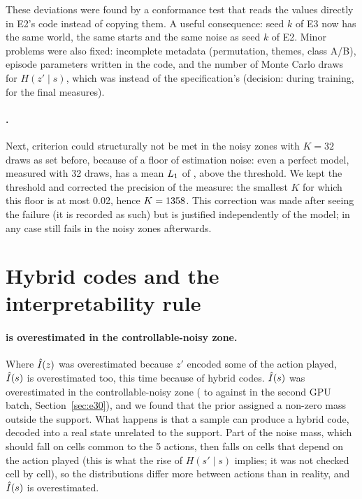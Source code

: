 \documentclass[10pt]{article}
\begin{document}
These deviations were found by a conformance test that reads the values directly in E2's code instead of copying them.
A useful consequence: seed $k$ of E3 now has the same world, the same starts and the same noise as seed $k$ of E2.
Minor problems were also fixed: incomplete metadata (permutation, themes, class A/B), episode parameters written in the
code, and the number of Monte Carlo draws for $H(z' \mid s)$, which was \eThreeIzMcTraining{} instead of the
specification's \eThreeIzMcFinal{} (decision: \eThreeIzMcTraining{} during training, \eThreeIzMcFinal{} for the final
measures).

\paragraph{\Ks.}
Next, criterion \Cb{} could structurally not be met in the noisy zones with $K = 32$ draws as set before, because of a %
floor of estimation noise: even a perfect model, measured with 32 draws, has a mean $L_{1}$ of \eThreeFloorOldK, above the %
threshold.
We kept the threshold and corrected the precision of the measure: the smallest $K$ for which this floor is at most
0.02, hence $K = 1358$. %
This correction was made after seeing the failure (it is recorded as such) but is justified independently of the model;
in any case \Cb{} still fails in the noisy zones afterwards.

\section{Hybrid codes and the interpretability rule}
\label{sec:hybrid}

\paragraph{\Is{} is overestimated in the controllable-noisy zone.}
Where $\hat{I}(z)$ was overestimated because $z'$ encoded some of the action played, $\hat{I}(s)$ is overestimated too, this
time because of hybrid codes.
$\hat{I}(s)$ was overestimated in the controllable-noisy zone (\eThreeZeroIsCNMin{} to \eThreeZeroIsCNMax{} against
\eThreeTrueICN{} in the second GPU batch, Section~\ref{sec:e30}), and we found that the prior assigned a non-zero mass outside
the support.
What happens is that a sample can produce a hybrid code, decoded into a real state unrelated to the support.
Part of the noise mass, which should fall on cells common to the 5 actions, then falls on cells that depend on the %
action played (this is what the rise of $H(s' \mid s)$ implies; it was not checked cell by cell), so the distributions
differ more between actions than in reality, and $\hat{I}(s)$ is overestimated.
\end{document}
